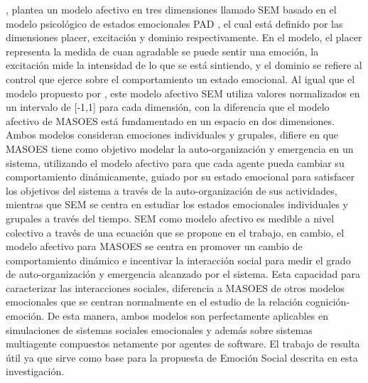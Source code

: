 \cite{rincon2015}, plantea un modelo afectivo en tres dimensiones llamado SEM
 basado en el modelo
psicológico de estados emocionales PAD ,
el cual está definido por las dimensiones placer,
excitación y dominio respectivamente. En el modelo, el placer representa la
medida de cuan agradable se puede sentir una emoción, la excitación mide la
intensidad de lo que se está sintiendo, y el dominio se refiere al control que
ejerce sobre el comportamiento un estado emocional. Al igual que el modelo
propuesto por \cite{perozo2012}, este modelo afectivo SEM utiliza valores
normalizados en un intervalo de [-1,1] para cada dimensión, con la diferencia
que el modelo afectivo de MASOES está fundamentado en un espacio en dos
dimensiones. Ambos modelos consideran emociones individuales y grupales, difiere
en que MASOES tiene como objetivo modelar la auto-organización y emergencia en
un sistema, utilizando el modelo afectivo para que cada agente pueda cambiar su
comportamiento dinámicamente, guiado por su estado emocional para satisfacer
los objetivos del sistema a través de la auto-organización de sus
actividades, mientras que SEM se centra en estudiar los estados emocionales
individuales y grupales a través del tiempo. SEM como modelo afectivo es medible
a nivel colectivo a través de una ecuación que se propone en el trabajo, en
cambio, el modelo afectivo para MASOES se centra en promover un cambio de
comportamiento dinámico e incentivar la interacción social para medir el grado
de auto-organización y emergencia alcanzado por el sistema. Esta capacidad para
caracterizar las interacciones sociales, diferencia a MASOES de otros modelos
emocionales que se centran normalmente en el estudio de la relación
cognición-emoción. De esta manera, ambos modelos son perfectamente aplicables en
simulaciones de sistemas sociales emocionales y además sobre sistemas
multiagente compuestos netamente por agentes de software.
El trabajo de \citeauthor{rincon2015}
resulta útil ya que sirve como base para la propuesta de Emoción Social descrita en esta investigación.

